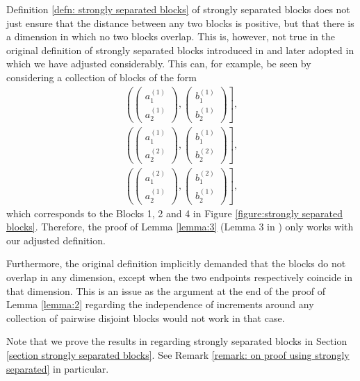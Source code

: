 \begin{remark} \label{remark:strongly separated blocks}
    Definition \ref{defn: strongly separated blocks} of strongly separated blocks does not just ensure that the distance between any two blocks is positive, but that there is a dimension in which no two blocks overlap. This is, however, not true in the original definition of strongly separated blocks introduced in \cite{[16]deo1975functional} and later adopted in \cite{[0]BUCCHIA2017344} which we have adjusted considerably. %
    This can, for example, be seen by considering a collection of blocks of the form
    \begin{align*} 
        \left( \begin{pmatrix}a_1^{(1)}\\a_2^{(1)}\end{pmatrix}, \begin{pmatrix}b_1^{(1)}\\b_2^{(1)}\end{pmatrix} \right], \\
        \left( \begin{pmatrix}a_1^{(1)}\\a_2^{(2)}\end{pmatrix}, \begin{pmatrix}b_1^{(1)}\\b_2^{(2)}\end{pmatrix} \right], \\
        \left( \begin{pmatrix}a_1^{(2)}\\a_2^{(1)}\end{pmatrix}, \begin{pmatrix}b_1^{(2)}\\b_2^{(1)}\end{pmatrix} \right],
    \end{align*}
    which corresponds to the Blocks 1, 2 and 4 in Figure \ref{figure:strongly separated blocks}. Therefore, the proof of Lemma \ref{lemma:3} (Lemma 3 in \cite{[0]BUCCHIA2017344}) only works with our adjusted definition.

    Furthermore, the original definition implicitly demanded that the blocks do not overlap in any dimension, except when the two endpoints respectively coincide in that dimension. This is an issue as the argument at the end of the proof of Lemma \ref{lemma:2} regarding the independence of increments around any collection of pairwise disjoint blocks would not work in that case.

    Note that we prove the results in \cite{[16]deo1975functional} regarding strongly separated blocks in Section \ref{section strongly separated blocks}. See Remark \ref{remark: on proof using strongly separated} in particular.
\end{remark}

